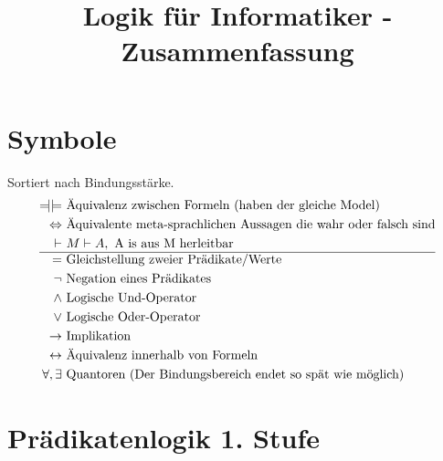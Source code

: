 \documentclass{article}
\title{Logik f\"ur Informatiker - Zusammenfassung}
\DeclareRobustCommand*{\tautequiv}{%
  \Relbar\joinrel\mathrel{|}
  \mathrel{|}\joinrel\Relbar%
}
\begin{document}
	\section*{Symbole}
		Sortiert nach Bindungsst\"arke.
		\begin{align*}
			\tautequiv & \text{ \"Aquivalenz zwischen Formeln (haben der gleiche Model)}\\
			\Leftrightarrow & \text{ \"Aquivalente meta-sprachlichen Aussagen die wahr oder falsch sind}\\
			\vdash &\ M \vdash A, \text{ A is aus M herleitbar}\\
			\hline
			= & \text{ Gleichstellung zweier Pr\"adikate/Werte}\\
			\neg & \text{ Negation eines Pr\"adikates}\\
			\wedge & \text{ Logische Und-Operator}\\
			\vee & \text{ Logische Oder-Operator}\\
			\rightarrow & \text{ Implikation}\\
			\leftrightarrow & \text{ \"Aquivalenz innerhalb von Formeln}\\
			\forall, \exists & \text{ Quantoren (Der Bindungsbereich endet so sp\"at wie m\"oglich)}\\
		\end{align*}
	\section{Pr\"adikatenlogik 1. Stufe}
\end{document}
